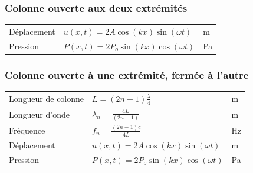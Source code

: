 \subsubsection{Colonne ouverte aux deux extrémités}

\begin{tabular}{lll}
Déplacement & \(u(x,t)=2A\cos(kx)\sin(\omega t)\) & \si{\meter}\\[5pt]
Pression & \(P(x,t)=2P_{o}\sin(kx)\cos(\omega t)\) & \si{\pascal}
\end{tabular}


\subsubsection{Colonne ouverte à une extrémité, fermée à l'autre}
\begin{tabular}{lll}
Longueur de colonne & \(L=(2n-1)\frac{\lambda}{4}\) & \si{\meter}\\
Longueur d'onde & \(\lambda_{n}=\frac{4L}{(2n-1)}\) & \si{\meter}\\[8pt]
Fréquence & \(f_{n}=\frac{(2n-1)c}{4L}\) & \si{\hertz}\\[8pt]
Déplacement & \(u(x,t)=2A\cos(kx)\sin(\omega t)\) & \si{\meter}\\[5pt]
Pression & \(P(x,t)=2P_{o}\sin(kx)\cos(\omega t)\) & \si{\pascal}
\end{tabular}

